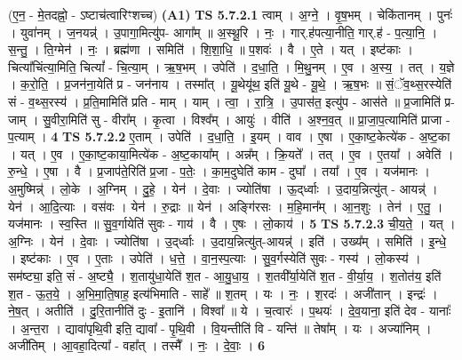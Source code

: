 \documentclass[17pt]{extarticle}
\begin{document}
                  \newline
                      (ए॒न॒ - मे॒तदह्नो॒ - ऽष्टाच॑त्वारिꣳशच्च)  \textbf{(A1)} \newline \newline
                                \textbf{ TS 5.7.2.1} \newline
                  त्वाम् । अ॒ग्ने॒ । वृ॒ष॒भम् । चेकि॑तानम् । पुनः॑ । युवा॑नम् । ज॒नयन्न्॑ । उ॒पागा॒मित्यु॑प- आगा᳚म् ॥ अ॒स्थू॒रि । नः॒ । गार्.ह॑पत्या॒नीति॒ गार्.ह॑ - प॒त्या॒नि॒ । स॒न्तु॒ । ति॒ग्मेन॑ । नः॒ । ब्रह्म॑णा । समिति॑ । शि॒शा॒धि॒ ॥ प॒शवः॑ । वै । ए॒ते । यत् । इष्ट॑काः । चित्या᳚चिंत्या॒मिति॒ चित्यां᳚ - चि॒त्या॒म् । ऋ॒ष॒भम् । उपेति॑ । द॒धा॒ति॒ । मि॒थु॒नम् । ए॒व । अ॒स्य॒ । तत् । य॒ज्ञे । क॒रो॒ति॒ । प्र॒जन॑ना॒येति॑ प्र - जन॑नाय । तस्मा᳚त् । यू॒थेयू॑थ॒ इति॑ यू॒थे - यू॒थे॒ । ऋ॒ष॒भः ॥ सं॒ॅव॒थ्स॒रस्येति॑ सं - व॒थ्स॒रस्य॑ । प्र॒ति॒मामिति॑ प्रति - माम् । याम् । त्वा॒ । रा॒त्रि॒ । उ॒पास॑त॒ इत्यु॑प - आस॑ते ॥ प्र॒जामिति॑ प्र- जाम् । सु॒वीरा॒मिति॑ सु - वीरा᳚म् । कृ॒त्वा । विश्व᳚म् । आयुः॑ । वीति॑ । अ॒श्न॒व॒त् ॥ प्रा॒जा॒प॒त्यामिति॑ प्राजा - प॒त्याम् । \textbf{  4} \newline
                  \newline
                                \textbf{ TS 5.7.2.2} \newline
                  ए॒ताम् । उपेति॑ । द॒धा॒ति॒ । इ॒यम् । वाव । ए॒षा । ए॒का॒ष्ट॒केत्ये॑क - अ॒ष्ट॒का । यत् । ए॒व । ए॒का॒ष्ट॒काया॒मित्ये॑क - अ॒ष्ट॒काया᳚म् । अन्न᳚म् । क्रि॒यते᳚ । तत् । ए॒व । ए॒तया᳚ । अवेति॑ । रु॒न्धे॒ । ए॒षा । वै । प्र॒जाप॑ते॒रिति॑ प्र॒जा - प॒तेः॒ । का॒म॒दुघेति॑ काम - दुघा᳚ । तया᳚ । ए॒व । यज॑मानः । अ॒मुष्मिन्न्॑ । लो॒के । अ॒ग्निम् । दु॒हे॒ । येन॑ । दे॒वाः । ज्योति॑षा । ऊ॒द्‌र्ध्वाः । उ॒दाय॒न्नित्यु॑त् - आयन्न्॑ । येन॑ । आ॒दि॒त्याः । वस॑वः । येन॑ । रु॒द्राः ॥ येन॑ । अङ्गि॑रसः । म॒हि॒मान᳚म् । आ॒न॒शुः । तेन॑ । ए॒तु॒ । यज॑मानः । स्व॒स्ति ॥ सु॒व॒र्गायेति॑ सुवः - गाय॑ । वै । ए॒षः । लो॒काय॑ । \textbf{  5} \newline
                  \newline
                                \textbf{ TS 5.7.2.3} \newline
                  ची॒य॒ते॒ । यत् । अ॒ग्निः । येन॑ । दे॒वाः । ज्योति॑षा । उ॒द्‌र्ध्वाः । उ॒दाय॒न्नित्यु॑त्-आयन्न्॑ । इति॑ । उख्य᳚म् । समिति॑ । इ॒न्धे॒ । इष्ट॑काः । ए॒व । ए॒ताः । उपेति॑ । ध॒त्ते॒ । वा॒न॒स्प॒त्याः । सु॒व॒र्गस्येति॑ सुवः - गस्य॑ । लो॒कस्य॑ । सम॑ष्ट्या॒ इति॒ सं - अ॒ष्ट्यै॒ । श॒तायु॑धा॒येति॑ श॒त - आ॒यु॒धा॒य॒ । श॒तवी᳚र्या॒येति॑ श॒त - वी॒र्या॒य॒ । श॒तोत॑य॒ इति॑ श॒त - ऊ॒त॒ये॒ । अ॒भि॒मा॒ति॒षाह॒ इत्य॑भिमाति -   साहे᳚ ॥ श॒तम् । यः । नः॒ । श॒रदः॑ । अजी॑तान् । इन्द्रः॑ । ने॒ष॒त् । अतीति॑ । दु॒रि॒तानीति॑ दुः - इ॒तानि॑ । विश्वा᳚ ॥ ये । च॒त्वारः॑ । प॒थयः॑ । दे॒व॒याना॒ इति॑ देव - यानाः᳚ । अ॒न्त॒रा । द्यावा॑पृथि॒वी इति॒ द्यावा᳚ - पृ॒थि॒वी । वि॒यन्तीति॑ वि - यन्ति॑ ॥ तेषा᳚म् । यः । अज्या॑निम् । अजी॑तिम् । आ॒वहा॒दित्या᳚ - वहा᳚त् । तस्मै᳚ । नः॒ । दे॒वाः॒ । \textbf{  6} \newline
\end{document}
